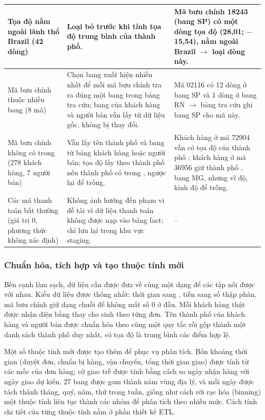 \begin{longtable}{|P{4.1cm}|P{5.6cm}|P{6.1cm}|}
Tọa độ nằm ngoài lãnh thổ Brazil (42 dòng) & Loại bỏ trước khi tính tọa độ trung bình của thành phố. & Mã bưu chính 18243 (bang SP) có một dòng tọa độ (28,01; $-$15,54), nằm ngoài Brazil $\rightarrow$ loại dòng này.\\ \hline
Mã bưu chính thuộc nhiều bang (8 mã) & Chọn bang xuất hiện nhiều nhất để mỗi mã bưu chính tra ra đúng một bang trong bảng tra cứu; bang của khách hàng và người bán vẫn lấy từ dữ liệu gốc, không bị thay đổi. & Mã 02116 có 12 dòng ở bang SP và 1 dòng ở bang RN $\rightarrow$ bảng tra cứu ghi bang SP cho mã này.\\ \hline
Mã bưu chính không có trong  (278 khách hàng, 7 người bán) & Vẫn lấy tên thành phố và bang từ bảng khách hàng hoặc người bán; tọa độ lấy theo thành phố nếu thành phố có trong , ngược lại để trống. & Khách hàng ở mã 72904 vẫn có tọa độ của thành phố ; khách hàng ở mã 36956 giữ thành phố , bang MG, nhưng vĩ độ, kinh độ để trống.\\ \hline
Các mã thanh toán bất thường (giá trị 0, phương thức không xác định) & Không ảnh hưởng đến phạm vi đề tài vì dữ liệu thanh toán không được nạp vào bảng fact; chỉ lưu lại trong khu vực staging. & --\\ \hline
\end{longtable}
\endgroup

\subsubsection{Chuẩn hóa, tích hợp và tạo thuộc tính mới}

Bên cạnh làm sạch, dữ liệu cần được đưa về cùng một dạng để các tập nối được với nhau. Kiểu dữ liệu được thống nhất: thời gian sang , tiền sang số thập phân, mã bưu chính giữ dạng chuỗi để không mất số 0 ở đầu. Mỗi khách hàng thật được nhận diện bằng  thay cho  sinh theo từng đơn. Tên thành phố của khách hàng và người bán được chuẩn hóa theo cùng một quy tắc rồi gộp thành một danh sách thành phố duy nhất, có tọa độ là trung bình các điểm  hợp lệ.

Một số thuộc tính mới được tạo thêm để phục vụ phân tích. Bốn khoảng thời gian (duyệt đơn, chuẩn bị hàng, vận chuyển, tổng thời gian giao) được tính từ các mốc của đơn hàng; cờ giao trễ được tính bằng cách so ngày nhận hàng với ngày giao dự kiến. 27 bang được gom thành năm vùng địa lý, và mỗi ngày được tách thành tháng, quý, năm, thứ trong tuần, giống như cách rời rạc hóa (binning) một thuộc tính liên tục thành các nhóm để phân tích theo nhiều mức. Cách tính chi tiết của từng thuộc tính nằm ở phần thiết kế ETL.

